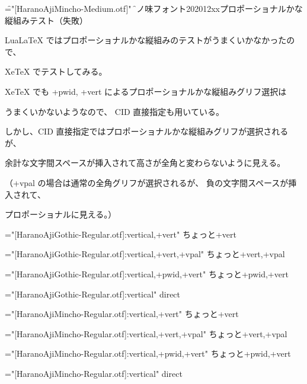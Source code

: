
\font\f="[HaranoAjiMincho-Medium.otf]"
\f

原ノ味フォント202012xxプロポーショナルかな縦組みテスト（失敗）

LuaLaTeX ではプロポーショナルかな縦組みのテストがうまくいかなかったので、

XeTeX でテストしてみる。

XeTeX でも +pwid, +vert によるプロポーショナルかな縦組みグリフ選択は

うまくいかないようなので、 CID 直接指定も用いている。

しかし、CID 直接指定ではプロポーショナルかな縦組みグリフが選択されるが、

余計な文字間スペースが挿入されて高さが全角と変わらないように見える。

（+vpal の場合は通常の全角グリフが選択されるが、
負の文字間スペースが挿入されて、

プロポーショナルに見える。）

\font\hgr="[HaranoAjiGothic-Regular.otf]:vertical,+vert"
\hgr
ちょっと+vert

\font\hgrvpal="[HaranoAjiGothic-Regular.otf]:vertical,+vert,+vpal"
\hgrvpal
ちょっと+vert,+vpal

\font\hgrpwidvert="[HaranoAjiGothic-Regular.otf]:vertical,+pwid,+vert"
\hgrpwidvert
ちょっと+pwid,+vert

\font\hgrdirect="[HaranoAjiGothic-Regular.otf]:vertical"
\hgrdirect
{}%
direct

\font\hmr="[HaranoAjiMincho-Regular.otf]:vertical,+vert"
\hmr
ちょっと+vert

\font\hmrvpal="[HaranoAjiMincho-Regular.otf]:vertical,+vert,+vpal"
\hmrvpal
ちょっと+vert,+vpal

\font\hmrpwidvert="[HaranoAjiMincho-Regular.otf]:vertical,+pwid,+vert"
\hmrpwidvert
ちょっと+pwid,+vert

\font\hmrdirect="[HaranoAjiMincho-Regular.otf]:vertical"
\hmrdirect
{}%
direct

\bye
